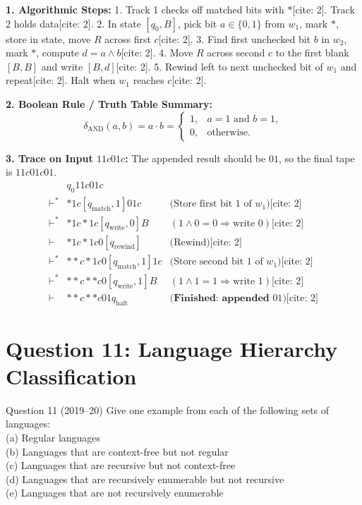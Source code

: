 \documentclass[11pt,a4paper]{article}
\begin{document}
\begin{solutionbox}
\textbf{1. Algorithmic Steps:}
1. Track 1 checks off matched bits with $*$[cite: 2]. Track 2 holds data[cite: 2].
2. In state $[q_0, B]$, pick bit $a \in \{0, 1\}$ from $w_1$, mark $*$, store in state, move $R$ across first $c$[cite: 2].
3. Find first unchecked bit $b$ in $w_2$, mark $*$, compute $d = a \land b$[cite: 2].
4. Move $R$ across second $c$ to the first blank $[B, B]$ and write $[B, d]$[cite: 2].
5. Rewind left to next unchecked bit of $w_1$ and repeat[cite: 2]. Halt when $w_1$ reaches $c$[cite: 2].

\textbf{2. Boolean Rule / Truth Table Summary:}
$$\delta_{\text{AND}}(a,b)=a\cdot b=\begin{cases}
1,& a=1\text{ and }b=1,\\
0,& \text{otherwise.}
\end{cases}$$

\textbf{3. Trace on Input $11c01c$:}
The appended result should be $01$, so the final tape is $11c01c01$.
$$
\begin{array}{rll}
& q_0 11c01c & \\
\vdash^*& *1c[q_{\text{match}},1]01c & \text{(Store first bit 1 of }w_1\text{)}\text{[cite: 2]}\\
\vdash^*& *1c*1c[q_{\text{write}},0]B & (1\land0=0\Rightarrow \text{write }0)\text{[cite: 2]}\\
\vdash& *1c*1c0[q_{\text{rewind}}] & \text{(Rewind)}\text{[cite: 2]}\\
\vdash^*& **c*1c0[q_{\text{match}},1]1c & \text{(Store second bit 1 of }w_1\text{)}\text{[cite: 2]}\\
\vdash^*& **c**c0[q_{\text{write}},1]B & (1\land1=1\Rightarrow \text{write }1)\text{[cite: 2]}\\
\vdash& **c**c01q_{\text{halt}} & \textbf{(Finished: appended }01\textbf{)}\text{[cite: 2]}
\end{array}
$$
\end{solutionbox}

\section{Question 11: Language Hierarchy Classification}
\begin{questionbox}{Question 11 (2019--20)}
Give one example from each of the following sets of languages: \\
(a) Regular languages \\
(b) Languages that are context-free but not regular \\
(c) Languages that are recursive but not context-free \\
(d) Languages that are recursively enumerable but not recursive \\
(e) Languages that are not recursively enumerable
\end{questionbox}
\end{document}
